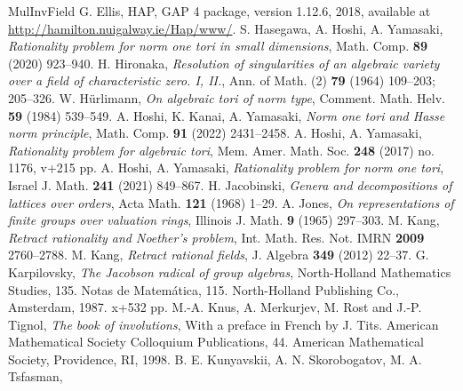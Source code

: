 \documentclass{amsart}
\theoremstyle{plain}
\theoremstyle{definition}
\theoremstyle{remark}
\begin{document}
{\begin{thebibliography}{MulInvField}
G. Ellis, HAP, GAP 4 package, version 1.12.6, 2018, 
available at \url{http://hamilton.nuigalway.ie/Hap/www/}.
S. Hasegawa, A. Hoshi, A. Yamasaki, 
{\it Rationality problem for norm one tori in small dimensions},
Math. Comp. \textbf{89} (2020) 923--940.
H. Hironaka, 
{\it Resolution of singularities of an algebraic variety 
over a field of characteristic zero. I, II.}, 
Ann. of Math. (2) \textbf{79} (1964) 109--203; 205--326. 
W. H\"{u}rlimann, 
{\it On algebraic tori of norm type}, Comment. Math. Helv. 
\textbf{59} (1984) 539--549.
A. Hoshi, K. Kanai, A. Yamasaki, 
{\it Norm one tori and Hasse norm principle}, 
Math. Comp. \textbf{91} (2022) 2431--2458.
 A. Hoshi, A. Yamasaki, 
{\it Rationality problem for algebraic tori}, 
Mem. Amer. Math. Soc. \textbf{248} (2017) no. 1176, v+215 pp.
 A. Hoshi, A. Yamasaki, 
{\it Rationality problem for norm one tori},
Israel J. Math. \textbf{241} (2021) 849--867. 
H. Jacobinski, 
{\it Genera and decompositions of lattices over orders}, 
Acta Math. \textbf{121} (1968) 1--29. 
A. Jones, 
{\it On representations of finite groups over valuation rings}, 
Illinois J. Math. \textbf{9} (1965) 297--303. 
M. Kang, 
{\it Retract rationality and Noether's problem}, 
Int. Math. Res. Not. IMRN \textbf{2009} 2760--2788. 
M. Kang, {\it Retract rational fields}, 
J. Algebra \textbf{349} (2012) 22--37. 
G. Karpilovsky, {\it The Jacobson radical of group algebras},
North-Holland Mathematics Studies, 135. Notas de Matem\'atica, 115. 
North-Holland Publishing Co., Amsterdam, 1987. x+532 pp. 
M.-A. Knus, A. Merkurjev, M. Rost and J.-P. Tignol, 
{\it The book of involutions}, With a preface in French by J. Tits. 
American Mathematical Society Colloquium Publications, 44. 
American Mathematical Society, Providence, RI, 1998.
B. E. Kunyavskii, A. N. Skorobogatov, M. A. Tsfasman, 

\end{thebibliography}}
\end{document}
